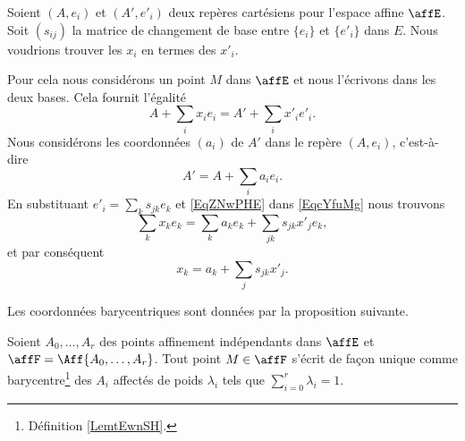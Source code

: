 \begin{normaltext}
	Soient \( (A,e_i)\) et \( (A',e'_i)\) deux repères cartésiens pour l'espace affine \( \affE\). Soit \( (s_{ij})\) la matrice de changement de base entre \( \{ e_i \}\) et \( \{ e'_i \}\) dans \( E\). Nous voudrions trouver les \( x_i\) en termes des \( x'_i\).

	Pour cela nous considérons un point \( M\) dans \( \affE\) et nous l'écrivons dans les deux bases. Cela fournit l'égalité
	\begin{equation}        \label{EqcYfuMg}
		A+\sum_ix_ie_i=A'+\sum_ix'_ie'_i.
	\end{equation}
	Nous considérons les coordonnées \( (a_i)\) de \( A'\) dans le repère \( (A,e_i)\), c'est-à-dire
	\begin{equation}    \label{EqZNwPHE}
		A'=A+\sum_ia_ie_i.
	\end{equation}
	En substituant \( e'_i=\sum_ks_{jk}e_k\) et \eqref{EqZNwPHE} dans \eqref{EqcYfuMg} nous trouvons
	\begin{equation}
		\sum_kx_ke_k=\sum_ka_ke_k+\sum_{jk}s_{jk}x'_je_k,
	\end{equation}
	et par conséquent
	\begin{equation}
		x_k=a_k+\sum_js_{jk}x'_j.
	\end{equation}
\end{normaltext}

Les coordonnées barycentriques sont données par la proposition suivante.
\begin{proposition}      \label{PROPooTIRXooLAipRa}
	Soient \( A_0,\ldots, A_r\) des points affinement indépendants dans \( \affE\) et \( \affF=\Aff\{ A_0,\ldots, A_r \}\). Tout point \( M\in\affF\) s'écrit de façon unique comme barycentre\footnote{Définition \ref{LemtEwnSH}.} des \( A_i\) affectés de poids \( \lambda_i\) tels que \( \sum_{i=0}^r\lambda_i=1\).
\end{proposition}


